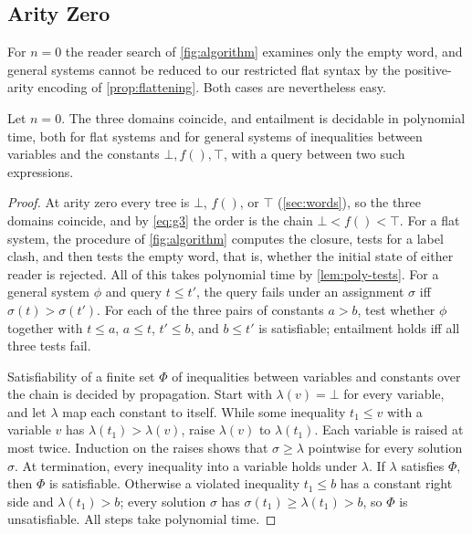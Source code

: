 \subsection{Arity Zero}

For $n=0$ the reader search of \cref{fig:algorithm} examines only the empty
word, and general systems cannot be reduced to our restricted flat syntax by
the positive-arity encoding of \cref{prop:flattening}. Both cases are
nevertheless easy.

\begin{proposition}\label{prop:arity-zero}
Let $n=0$. The three domains coincide, and entailment is decidable in
polynomial time, both for flat systems and for general systems of
inequalities between variables and the constants $\bot,f(),\top$, with a
query between two such expressions.
\end{proposition}

\begin{proof}
At arity zero every tree is $\bot$, $f()$, or $\top$ (\cref{sec:words}), so
the three domains coincide, and by \eqref{eq:g3} the order is the chain
$\bot<f()<\top$. For a flat system, the procedure of \cref{fig:algorithm}
computes the closure, tests for a label clash, and then tests the empty
word, that is, whether the initial state of either reader is rejected. All of
this takes polynomial time by \cref{lem:poly-tests}. For a general system
$\phi$ and query $t\le t'$, the query fails under an assignment $\sigma$ iff
$\sigma(t)>\sigma(t')$. For each of the three pairs of constants $a>b$, test
whether $\phi$ together with $t\le a$, $a\le t$, $t'\le b$, and $b\le t'$ is
satisfiable; entailment holds iff all three tests fail.

Satisfiability of a finite set $\Phi$ of inequalities between variables and
constants over the chain is decided by propagation. Start with
$\lambda(v)=\bot$ for every variable, and let $\lambda$ map each constant to
itself. While some inequality $t_1\le v$ with a variable $v$ has
$\lambda(t_1)>\lambda(v)$, raise $\lambda(v)$ to $\lambda(t_1)$. Each variable
is raised at most twice. Induction on the raises shows that
$\sigma\ge\lambda$ pointwise for every solution $\sigma$. At termination,
every inequality into a variable holds under $\lambda$. If $\lambda$
satisfies $\Phi$, then $\Phi$ is satisfiable. Otherwise a violated
inequality $t_1\le b$ has a constant right side and $\lambda(t_1)>b$; every
solution $\sigma$ has $\sigma(t_1)\ge\lambda(t_1)>b$, so $\Phi$ is
unsatisfiable. All steps take polynomial time.
\end{proof}
